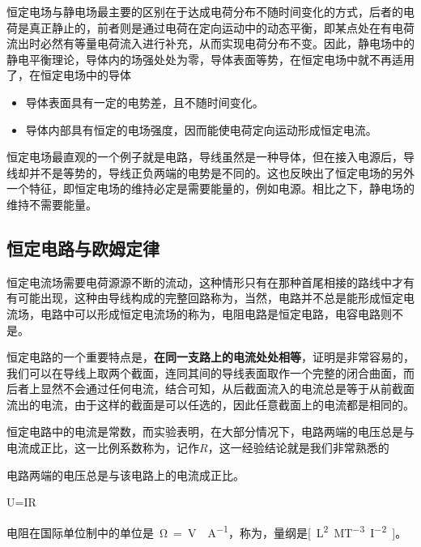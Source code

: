 恒定电场与静电场最主要的区别在于达成电荷分布不随时间变化的方式，后者的电荷是真正静止的，前者则是通过电荷在定向运动中的动态平衡，即某点处在有电荷流出时必然有等量电荷流入进行补充，从而实现电荷分布不变。因此，静电场中的静电平衡理论，导体内的场强处处为零，导体表面等势，在恒定电场中就不再适用了，在恒定电场中的导体
\begin{itemize}
    \item 导体表面具有一定的电势差，且不随时间变化。
    \item 导体内部具有恒定的电场强度，因而能使电荷定向运动形成恒定电流。
\end{itemize}
恒定电场最直观的一个例子就是电路，导线虽然是一种导体，但在接入电源后，导线却并不是等势的，导线正负两端的电势是不同的。这也反映出了恒定电场的另外一个特征，即恒定电场的维持必定是需要能量的，例如电源。相比之下，静电场的维持不需要能量。

\subsection{恒定电路与欧姆定律}
恒定电流场需要电荷源源不断的流动，这种情形只有在那种首尾相接的路线中才有有可能出现，这种由导线构成的完整回路称为，当然，电路并不总是能形成恒定电流场，电路中可以形成恒定电流场的称为，电阻电路是恒定电路，电容电路则不是。


恒定电路的一个重要特点是，\textbf{在同一支路上的电流处处相等}，证明是非常容易的，我们可以在导线上取两个截面，连同其间的导线表面取作一个完整的闭合曲面，而后者上显然不会通过任何电流，结合可知，从后截面流入的电流总是等于从前截面流出的电流，由于这样的截面是可以任选的，因此任意截面上的电流都是相同的。

恒定电路中的电流是常数，而实验表明，在大部分情况下，电路两端的电压总是与电流成正比，这一比例系数称为，记作$R$，这一经验结论就是我们非常熟悉的
\begin{BoxPrinciple}[欧姆定律]
    电路两端的电压总是与该电路上的电流成正比。
    \begin{BoxEq}
        U=IR
    \end{BoxEq}
\end{BoxPrinciple}
电阻在国际单位制中的单位是~\si{\ohm=V\cdot A^{-1}}，称为，量纲是\si{[L^{2}MT^{-3}I^{-2}]}。

